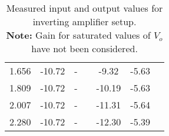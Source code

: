 \begin{table}[H]
\begin{tabular}{|c|ccc|ccc|}
    1.656                  & \multicolumn{1}{c|}{-10.72} & \multicolumn{1}{c|}{-} &                    & \multicolumn{1}{c|}{-9.32} & \multicolumn{1}{c|}{-5.63} &                    \\ \cline{1-3} \cline{5-6}
    1.809                  & \multicolumn{1}{c|}{-10.72} & \multicolumn{1}{c|}{-} &                    & \multicolumn{1}{c|}{-10.19} & \multicolumn{1}{c|}{-5.63} &                    \\ \cline{1-3} \cline{5-6}
    2.007                  & \multicolumn{1}{c|}{-10.72} & \multicolumn{1}{c|}{-} &                    & \multicolumn{1}{c|}{-11.31} & \multicolumn{1}{c|}{-5.64} &                    \\ \cline{1-3} \cline{5-6}
    2.280                  & \multicolumn{1}{c|}{-10.72} & \multicolumn{1}{c|}{-} &                    & \multicolumn{1}{c|}{-12.30} & \multicolumn{1}{c|}{-5.39} &                    \\ \hline
    \end{tabular}
    \caption{Measured input and output values for inverting amplifier setup.\\\textbf{Note: } Gain for saturated values of $V_o$ have not been considered.}
    \label{tab:1}
    \end{table}